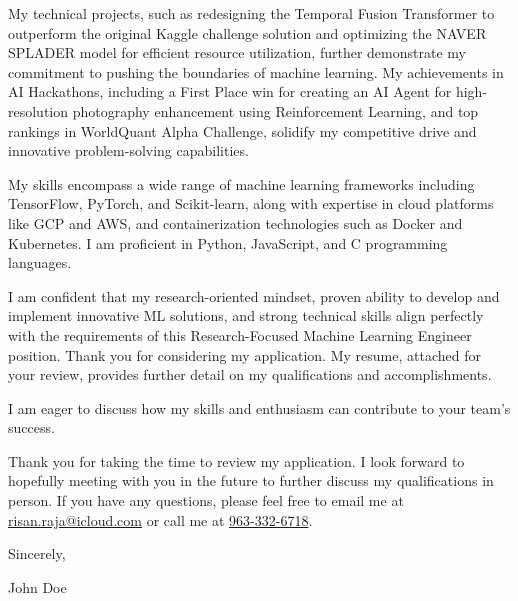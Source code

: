 \documentclass{ExpressiveCoverLetter}
\begin{document}
My technical projects, such as redesigning the Temporal Fusion 
Transformer to outperform the original Kaggle challenge solution 
and optimizing the NAVER SPLADER model for efficient resource 
utilization, further demonstrate my commitment to pushing the boundaries 
of machine learning. My achievements in AI Hackathons, including a First 
Place win for creating an AI Agent for high-resolution photography
enhancement 
using Reinforcement Learning, and top rankings in WorldQuant Alpha
Challenge, solidify my competitive drive and innovative problem-solving capabilities.

My skills encompass a wide range of machine learning frameworks 
including TensorFlow, PyTorch, and Scikit-learn, along with expertise 
in cloud platforms like GCP and AWS, and containerization technologies 
such as Docker and Kubernetes. I am proficient in Python, JavaScript, 
and C programming languages.

I am confident that my research-oriented mindset, 
proven ability to develop and implement innovative ML solutions, 
and strong technical skills align perfectly with the requirements of 
this Research-Focused Machine Learning Engineer position. 
Thank you for considering my application. My resume, attached for your 
review, provides further detail on my qualifications and
accomplishments.


I am eager to discuss how my skills and enthusiasm can contribute to 
your team's success.

Thank you for taking the time to review my application. I look forward
to hopefully meeting with you in the future to further discuss my
qualifications in person. If you have any questions, please feel free to
email me at \href{mailto:risan.raja@icloud.com}{risan.raja@icloud.com} or
call me at \href{tel:+91-963-332-6718}{963-332-6718}.

Sincerely,

\vspace{.15in}

John Doe
\end{document}
